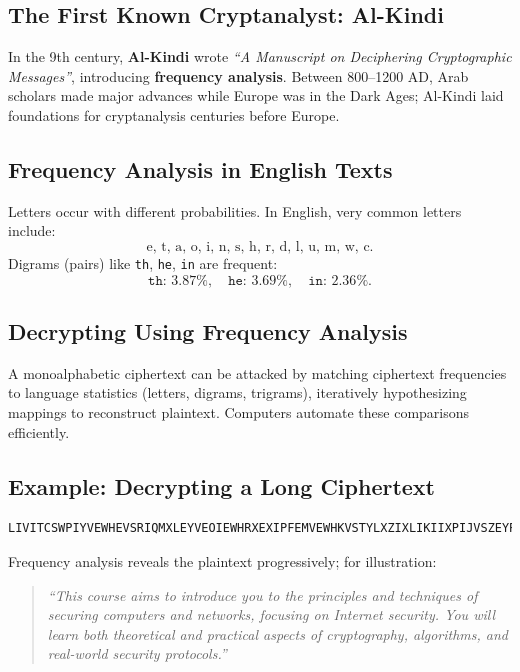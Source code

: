\subsection{The First Known Cryptanalyst: Al-Kindi}

In the 9th century, \textbf{Al-Kindi} wrote \emph{“A Manuscript on Deciphering Cryptographic Messages”}, introducing \textbf{frequency analysis}. Between 800–1200 AD, Arab scholars made major advances while Europe was in the Dark Ages; Al-Kindi laid foundations for cryptanalysis centuries before Europe.

\subsection{Frequency Analysis in English Texts}

Letters occur with different probabilities. In English, very common letters include:
\[
\text{e, t, a, o, i, n, s, h, r, d, l, u, m, w, c}.
\]
Digrams (pairs) like \texttt{th}, \texttt{he}, \texttt{in} are frequent:
\[
\texttt{th}\!:\,3.87\%,\quad \texttt{he}\!:\,3.69\%,\quad \texttt{in}\!:\,2.36\%.
\]

\subsection{Decrypting Using Frequency Analysis}

A monoalphabetic ciphertext can be attacked by matching ciphertext frequencies to language statistics (letters, digrams, trigrams), iteratively hypothesizing mappings to reconstruct plaintext. Computers automate these comparisons efficiently.

\subsection{Example: Decrypting a Long Ciphertext}

\begin{verbatim}
LIVITCSWPIYVEWHEVSRIQMXLEYVEOIEWHRXEXIPFEMVEWHKVSTYLXZIXLIKIIXPIJVSZEYPE...
\end{verbatim}

Frequency analysis reveals the plaintext progressively; for illustration:
\begin{quote}
\textit{“This course aims to introduce you to the principles and techniques of securing computers and networks, focusing on Internet security. You will learn both theoretical and practical aspects of cryptography, algorithms, and real-world security protocols.”}
\end{quote}

